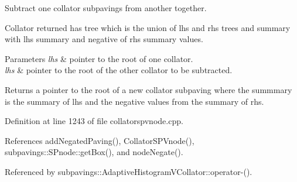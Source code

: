 \-Subtract one collator subpavings from another together. 

\-Collator returned has tree which is the union of lhs and rhs trees and summary with lhs summary and negative of rhs summary values.


\begin{DoxyParams}{\-Parameters}
{\em lhs} & pointer to the root of one collator. \\
\hline
{\em lhs} & pointer to the root of the other collator to be subtracted. \\
\hline
\end{DoxyParams}
\begin{DoxyReturn}{\-Returns}
a pointer to the root of a new collator subpaving where the summmary is the summary of lhs and the negative values from the summary of rhs. 
\end{DoxyReturn}


\-Definition at line 1243 of file collatorspvnode.\-cpp.



\-References add\-Negated\-Paving(), \-Collator\-S\-P\-Vnode(), subpavings\-::\-S\-Pnode\-::get\-Box(), and node\-Negate().



\-Referenced by subpavings\-::\-Adaptive\-Histogram\-V\-Collator\-::operator-\/().


